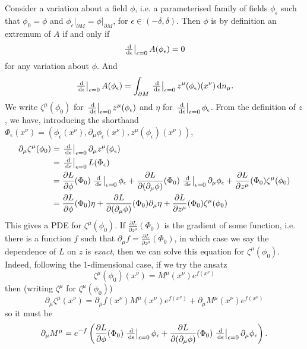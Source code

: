 \documentclass[12pt]{article}
\begin{document}
Consider a variation about a field \( \phi \), i.e. a parameterised family of fields \(
\phi_\epsilon \) such that \( \phi_0 = \phi \) and \( \phi_\epsilon \vert_{\partial M} =
\phi\vert_{\partial M} \), for \( \epsilon \in (-\delta, \delta) \). Then \( \phi \) is by
definition an extremum of \( A \) if and only if
\begin{equation}
	\left.\tfrac{\, \mathrm{d}}{\, \mathrm{d} \epsilon}\right\vert_{\epsilon=0} A(\phi_\epsilon) = 0
\end{equation}
for any variation about \( \phi \). And
\begin{equation}
	\left.\tfrac{\, \mathrm{d}}{\, \mathrm{d} \epsilon}\right\vert_{\epsilon=0} A(\phi_\epsilon) = \int_{\partial M} \left.\tfrac{\, \mathrm{d}}{\, \mathrm{d} \epsilon}\right\vert_{\epsilon=0}
	z^\mu(\phi_\epsilon)(x^\nu) \, \mathrm{d} n_\mu.
\end{equation}
We write \( \zeta^\mu(\phi_0) \) for \( \left.\tfrac{\, \mathrm{d}}{\, \mathrm{d} \epsilon}\right\vert_{\epsilon=0}z^\mu(\phi_\epsilon) \) and \(
\eta \) for \( \left.\tfrac{\, \mathrm{d}}{\, \mathrm{d} \epsilon}\right\vert_{\epsilon=0}\phi_\epsilon \). From the
definition of \( z \), we have, introducing the shorthand \( \Phi_\epsilon(x^\nu) =
(\phi_\epsilon(x^\nu), \partial_\mu \phi_\epsilon(x^\nu), z^\mu(\phi_\epsilon)(x^\nu)) \),
\begin{align}
	\partial_\mu \zeta^\mu(\phi_0)
	& = \left.\tfrac{\, \mathrm{d}}{\, \mathrm{d} \epsilon}\right\vert_{\epsilon=0} \partial_\mu z^\mu(\phi_\epsilon) \\
	& = \left.\tfrac{\, \mathrm{d}}{\, \mathrm{d} \epsilon}\right\vert_{\epsilon=0} L(\Phi_\epsilon) \\
	& = \frac{\partial L}{\partial \phi}(\Phi_0) \left.\tfrac{\, \mathrm{d}}{\, \mathrm{d} \epsilon}\right\vert_{\epsilon=0} \phi_\epsilon
	+ \frac{\partial L}{\partial(\partial_\mu \phi)}(\Phi_0) \left.\tfrac{\, \mathrm{d}}{\, \mathrm{d} \epsilon}\right\vert_{\epsilon=0} \partial_\mu
	\phi_\epsilon 
	+ \frac{\partial L}{\partial z^\mu}(\Phi_0) \zeta^\mu(\phi_0) \\
	& = \frac{\partial L}{\partial \phi}(\Phi_0) \eta
	+ \frac{\partial L}{\partial(\partial_\mu \phi)}(\Phi_0) \partial_\mu \eta
	+ \frac{\partial L}{\partial z^\mu}(\Phi_0) \zeta^\mu(\phi_0)
\end{align}
This gives a PDE for \( \zeta^\mu(\phi_0) \). If \( \frac{\partial L}{\partial
z^\mu} (\Phi_0) \) is the gradient of some function, i.e. there is a function \( f
\) such that \( \partial_\mu f = \frac{\partial L}{\partial z^\mu} (\Phi_0) \),
in which case we say the dependence of \( L \) on \( z \) is \emph{exact}, then we can
solve this equation for \( \zeta^\mu(\phi_0) \). Indeed, following the 1-dimensional case,
if we try the ansatz
\begin{equation}
	\zeta^\mu(\phi_0)(x^\nu) = M^\mu(x^\nu) e^{f(x^\nu)}
\end{equation}
then (writing \( \zeta^\mu \) for \( \zeta^\mu(\phi_0) \))
\begin{equation}
	\partial_\mu \zeta^\mu(x^\nu) = \partial_\mu f(x^\nu) M^\mu(x^\nu) e^{f(x^\nu)} +
	\partial_\mu M^\mu(x^\nu) e^{f(x^\nu)}
\end{equation}
so it must be
\begin{equation}
	\partial_\mu M^\mu = e^{-f}\left(\frac{\partial L}{\partial \phi}(\Phi_0) \left.\tfrac{\, \mathrm{d}}{\, \mathrm{d} \epsilon}\right\vert_{\epsilon=0}
	\phi_\epsilon + \frac{\partial L}{\partial(\partial_\mu \phi)}(\Phi_0) \left.\tfrac{\, \mathrm{d}}{\, \mathrm{d} \epsilon}\right\vert_{\epsilon=0}
	\partial_\mu \phi_\epsilon\right). 
\end{equation}
\end{document}
